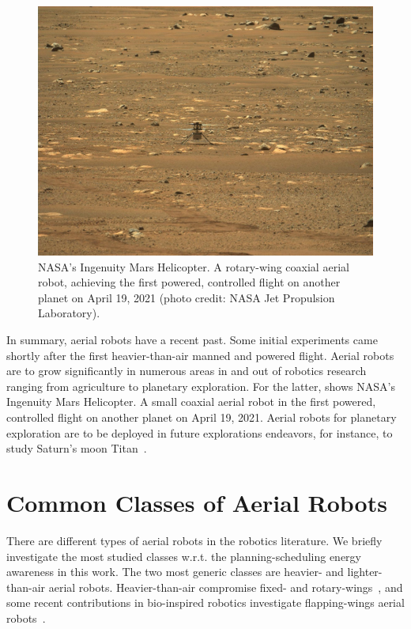 \begin{figure}[t]
  \centering
  \includegraphics[width=.7\textwidth]{pictures/jpegPIA24550}
  \caption[NASA's Ingenuity Mars helicopter]{NASA's Ingenuity Mars Helicopter. A rotary-wing coaxial aerial robot, achieving the first powered, controlled flight on another planet on April 19, 2021 {\scriptsize(photo credit: NASA Jet Propulsion Laboratory)}.}   
  \label{fig:ingenuity}
\end{figure}
In summary, aerial robots have a recent past. Some initial experiments came shortly after the first heavier-than-air manned and powered flight. %
Aerial robots are to grow significantly in numerous areas in and out of robotics research ranging from agriculture to planetary exploration. For the latter,  shows NASA's Ingenuity Mars Helicopter. A small coaxial aerial robot in the first powered, controlled flight on another planet on April 19, 2021. Aerial robots for planetary exploration are to be deployed in future explorations endeavors, for instance, to study Saturn's moon Titan~\citep{voosen2019nasa}.


\section{Common Classes of Aerial Robots}
\label{sec:aerial-robo-types}

There are different types of aerial robots in the robotics literature. We briefly investigate the most studied classes w.r.t. the planning-scheduling energy awareness in this work. The two most generic classes are heavier- and lighter-than-air aerial robots. Heavier-than-air compromise fixed- and rotary-wings~\citep{siciliano2016springer}, and some recent contributions in bio-inspired robotics investigate flapping-wings aerial robots~\citep{floreano2015science}.


